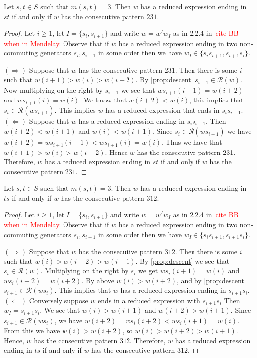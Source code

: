 \begin{lemma}\label{lem:ts}
Let $s,t \in S$ such that $m(s,t)=3.$ Then $w$ has a reduced expression ending in $st$ if and only if $w$ has the consecutive pattern $231$.
\begin{proof}
	Let $i \geq 1$, let $I=\{s_i,s_{i+1}\}$ and write $w=w^Iw_I$ as in 2.2.4 in~\textcolor{red}{cite BB when in Mendelay}. Observe that if $w$ has a reduced expression ending in two non-commuting generators $s_i, s_{i+1}$ in some order then we have $w_I \in \{s_is_{i+1}, s_{i+1}s_i\}$.
	
	$(\Rightarrow)$ Suppose that $w$ has the consecutive pattern $231$. Then there is some $i$ such that $w(i+1)>w(i)>w(i+2)$. By \ref{prop:descent} $s_{i+1} \in \mathcal{R}(w)$. Now multiplying on the right by $s_{i+1}$ we see that $ws_{i+1}(i+1)=w(i+2)$ and $ws_{i+1}(i)=w(i)$. We know that $w(i+2)<w(i)$, this implies that $s_i \in \mathcal{R}(ws_{i+1})$. This implies $w$ has a reduced expression that ends in $s_is_{i+1}$.
	$(\Leftarrow)$ Suppose that $w$ has a reduced expression ending in $s_is_{i+1}$. Then $w(i+2)<w(i+1)$ and $w(i)<w(i+1)$. Since $s_i \in \mathcal{R}(ws_{i+1})$ we have $w(i+2)=ws_{i+1}(i+1)<ws_{i+1}(i)=w(i)$. Thus we have that $w(i+1) > w(i) > w(i+2)$. Hence $w$ has the consecutive pattern 231.
	Therefore, $w$ has a reduced expression ending in $st$ if and only if $w$ has the consecutive pattern $231$.
\end{proof}	
\end{lemma}


\begin{lemma}\label{lem:st}
Let $s,t \in S$ such that $m(s,t)=3.$ Then $w$ has a reduced expression ending in $ts$ if and only if $w$ has the consecutive pattern $312$.
\begin{proof}
	Let $i \geq 1$, let $I=\{s_i,s_{i+1}\}$ and write $w=w^Iw_I$ as in 2.2.4 in~\textcolor{red}{cite BB when in Mendelay}. Observe that if $w$ has a reduced expression ending in two non-commuting generators $s_i, s_{i+1}$ in some order then we have $w_I \in \{s_is_{i+1}, s_{i+1}s_i\}$.
	
	$(\Rightarrow)$ Suppose that $w$ has the consecutive pattern $312$.  Then there is some $i$ such that $w(i)>w(i+2)>w(i+1)$. By \ref{prop:descent} we see that $s_i \in \mathcal{R}(w)$. Multiplying on the right by $s_i$ we get $ws_i(i+1)=w(i)$ and $ws_i(i+2)=w(i+2)$. By above $w(i)>w(i+2)$, and by \ref{prop:descent} $s_{i+1} \in \mathcal{R}(ws_i)$. This implies that $w$ has a reduced expression ending in $s_{i+1}s_i$. 
	$(\Leftarrow)$ Conversely suppose $w$ ends in a reduced expression with $s_{i+1}s_i$ Then $w_I=s_{i+1}s_i$. We see that $w(i)>w(i+1)$ and $w(i+2)>w(i+1)$. Since $s_{i+1} \in \mathcal{R}(ws_i)$, we have $w(i+2)=ws_i(i+2)<ws_i(i+1)=w(i)$. From this we have $w(i)>w(i+2)$, so $w(i)>w(i+2)>w(i+1)$. Hence, $w$ has the consecutive pattern $312$. Therefore, $w$ has a reduced expression ending in $ts$ if and only if $w$ has the consecutive pattern $312$.
\end{proof}
\end{lemma}
